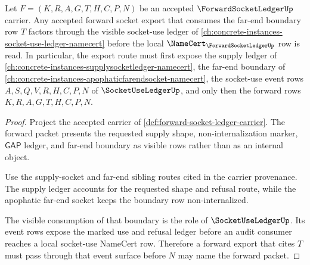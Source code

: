 \begin{theorem}
\label{thm:forward-socket-ledger-socketuse-dependency-route}
Let $F=(K,R,A,G,T,H,C,P,N)$ be an accepted $\ForwardSocketLedgerUp$ carrier. Any accepted forward socket export that consumes the far-end boundary row $T$ factors through the visible socket-use ledger of \autoref{ch:concrete-instances-socket-use-ledger-namecert} before the local $\NameCert_{\ForwardSocketLedgerUp}$ row is read. In particular, the export route must first expose the supply ledger of \autoref{ch:concrete-instances-supplysocketledger-namecert}, the far-end boundary of \autoref{ch:concrete-instances-apophaticfarendsocket-namecert}, the socket-use event rows $A,S,Q,V,R,H,C,P,N$ of $\SocketUseLedgerUp$, and only then the forward rows $K,R,A,G,T,H,C,P,N$.
\end{theorem}
\begin{proof}
Project the accepted carrier of \autoref{def:forward-socket-ledger-carrier}. The forward packet presents the requested supply shape, non-internalization marker, $\mathsf{GAP}$ ledger, and far-end boundary as visible rows rather than as an internal object.

Use the supply-socket and far-end sibling routes cited in the carrier provenance. The supply ledger accounts for the requested shape and refusal route, while the apophatic far-end socket keeps the boundary row non-internalized.

The visible consumption of that boundary is the role of $\SocketUseLedgerUp$. Its event rows expose the marked use and refusal ledger before an audit consumer reaches a local socket-use NameCert row. Therefore a forward export that cites $T$ must pass through that event surface before $N$ may name the forward packet.
\end{proof}

